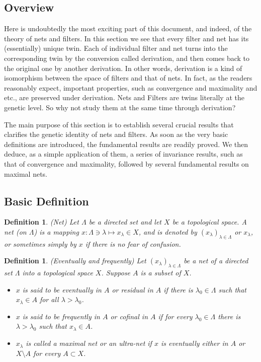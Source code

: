 \documentclass[a4paper,12pt]{article}
\newtheorem{dfn}[thm]{Definition}
\theoremstyle{remark}
\theoremstyle{definition}
\theoremstyle{definition}
\theoremstyle{definition}
\begin{document}
\subsection{Overview}

Here is undoubtedly the most exciting part of this document, and indeed, of the theory of nets and filters.
In this section we see that every filter and net has its (essentially) unique twin. Each of individual filter and net turns into the corresponding twin by the conversion called derivation, and then comes back to the original one by another derivation. In other words, derivation is a kind of isomorphism between the space of filters and that of nets. In fact, as the readers reasonably expect, important properties, such as convergence and maximality and etc., are preserved under derivation. Nets and Filters are twins literally at the genetic level. So why not study them at the same time through derivation?

The main purpose of this section is to establish several crucial results that clarifies the genetic identity of nets and filters. As soon as the very basic definitions are introduced, the fundamental results are readily proved. We then deduce, as a simple application of them, a series of invariance results, such as that of convergence and maximality, followed by several fundamental results on maximal nets.

\subsection{Basic Definition}

\begin{dfn} (Net)
	Let \( \Lambda \) be a directed set and let \( X \) be a topological space.
	A net (on \( \Lambda \)) is a mapping \( x: \Lambda \ni \lambda \mapsto x_{\lambda}\in X \), and is denoted by \( (x_{\lambda})_{\lambda \in \Lambda} \) or \( x_{\lambda} \), or sometimes simply by \( x \) if there is no fear of confusion.
\end{dfn}

\begin{dfn} (Eventually and frequently)
	Let \( (x_{\lambda})_{\lambda \in \Lambda} \) be a net of a directed set \( \Lambda \) into a topological space \( X \). Suppose \( A \) is a subset of \( X \).
	\begin{itemize}
		\item \( x \) is said to be eventually in \( A \) or residual in \( A \) if there is \( \lambda_0 \in \Lambda \) such that \( x_{\lambda} \in A\) for all \( \lambda >\lambda_0 \).
		\item \( x \) is said to be frequently in \( A \) or cofinal in \( A \) if for every \( \lambda_0 \in \Lambda \) there is \( \lambda > \lambda_0\) such that \( x_{\lambda} \in A\).
		\item \( x_{\lambda} \) is called a maximal net or an ultra-net if \( x \) is eventually either in \( A \) or \( X \setminus A \) for every \( A \subset X \).
	\end{itemize}
\end{dfn}
\end{document}
